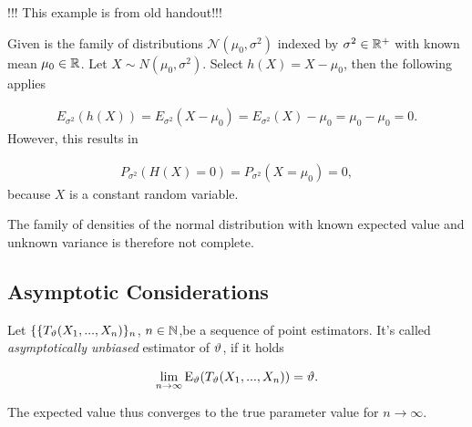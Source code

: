 \documentclass[ 11pt,%
				a4paper,%
				twoside,%
				headinclude,%
				footinclude = true,%
				cleardoublepage = empty,%
				reqno]{scrbook}
\begin{document}
\begin{example}

\begin{myfont}
 !!! This example is from old handout!!! 
\end{myfont}
Given is the family of  distributions $\mathcal{N}(\mu_0, \sigma^2)$ indexed by $\sigma^2 \in \mathbb{R}^+$ with known mean $\mu_0 \in \mathbb{R}$. Let $X \sim N(\mu_0, \sigma^2)$. Select $h(X) = X - \mu_0$, then the following applies

\begin{align*}
E_{\sigma^2}(h(X)) = E_{\sigma^2}(X - \mu_0) = E_{\sigma^2}(X) - \mu_0 = \mu_0 - \mu_0 = 0.
\end{align*}
However, this results in

\begin{align*}
P_{\sigma^2}(H(X) = 0) = P_{\sigma^2}(X = \mu_0) = 0,
\end{align*}
because $X$ is a constant random variable.

The family of densities of the normal distribution with known expected value and unknown variance is therefore not complete.
\end{example}



\subsection{Asymptotic Considerations}



\begin{definition}
Let $\{\{T_{\vartheta}(X_1, ..., X_n)\}_n$, $n \in \mathbb{N}$,be  a sequence of point estimators. It's called \emph{asymptotically unbiased} estimator of $\vartheta$, if it holds

\begin{align*}
    \lim_{n \to \infty} \text{E}_{\vartheta}(T_{\vartheta}(X_1, ..., X_n)) = \vartheta.
\end{align*}

The expected value thus converges  to the true parameter value for $n \to \infty$.
\end{definition}
\end{document}
